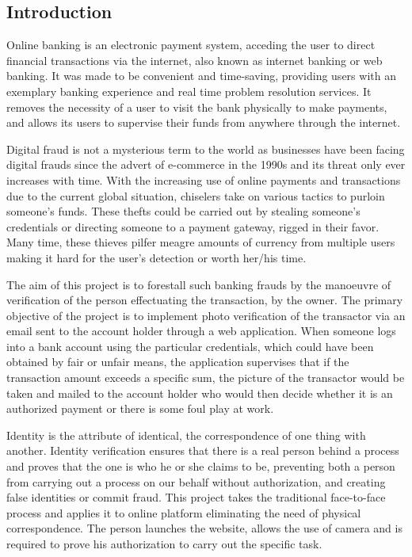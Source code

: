 \documentclass[12pt, oneside, a4paper]{article}
\begin{document}
\subsection{Introduction}
Online banking is an electronic payment system, acceding the user to direct financial transactions via the internet, also known as internet banking or web banking. It was made to be convenient and time-saving, providing users with an exemplary banking experience and real time problem resolution services. It removes the necessity of a user to visit the bank physically to make payments, and allows its users to supervise their funds from anywhere through the internet.

Digital fraud is not a mysterious term to the world as businesses have been facing digital frauds since the advert of e-commerce in the 1990s and its threat only ever increases with time. With the increasing use of online payments and transactions due to the current global situation, chiselers take on various tactics to purloin someone's funds. These thefts could be carried out by stealing someone's credentials or directing someone to a payment gateway, rigged in their favor. Many time, these thieves pilfer meagre amounts of currency from multiple users making it hard for the user's detection or worth her/his time.

The aim of this project is to forestall such banking frauds by the manoeuvre of verification of the person effectuating the transaction, by the owner. The primary objective of the project is to implement photo verification of the transactor via an email sent to the account holder through a web application. When someone logs into a bank account using the particular credentials, which could have been obtained by fair or unfair means, the application supervises that if the transaction amount exceeds a specific sum, the picture of the transactor would be taken and mailed to the account holder who would then decide whether it is an authorized payment or there is some foul play at work.

Identity is the attribute of identical, the correspondence of one thing with another. Identity verification ensures that there is a real person behind a process and proves that the one is who he or she claims to be, preventing both a person from carrying out a process on our behalf without authorization, and creating false identities or commit fraud. This project takes the traditional face-to-face process and applies it to online platform eliminating the need of physical correspondence. The person launches the website, allows the use of camera and is required to prove his authorization to carry out the specific task.
\end{document}
